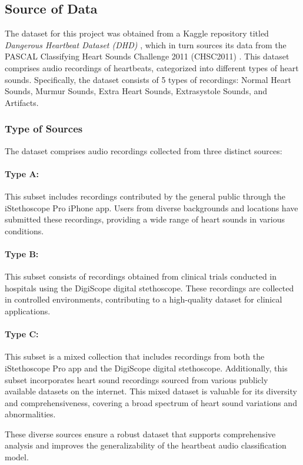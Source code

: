 \subsection{Source of Data}
The dataset for this project was obtained from a Kaggle repository titled \textit{Dangerous Heartbeat Dataset (DHD)} \cite{Dangerous-Heartbeat-Dataset-DHD},
which in turn sources its data from the PASCAL Classifying Heart Sounds Challenge 2011 (CHSC2011) \cite{pascal-chsc-2011}.
This dataset comprises audio recordings of heartbeats, categorized into different types of heart sounds.
Specifically, the dataset consists of 5 types of recordings: Normal Heart Sounds, Murmur Sounds, Extra Heart Sounds, Extrasystole Sounds, and Artifacts.
\subsubsection*{Type of Sources} %
The dataset comprises audio recordings collected from three distinct sources:
\paragraph{Type A:}
This subset includes recordings contributed by the general public through the iStethoscope Pro iPhone app.
Users from diverse backgrounds and locations have submitted these recordings, providing a wide range of heart sounds in various conditions.
\paragraph{Type B:}
This subset consists of recordings obtained from clinical trials conducted in hospitals using the DigiScope digital stethoscope.
These recordings are collected in controlled environments, contributing to a high-quality dataset for clinical applications.
\paragraph{Type C:}
This subset is a mixed collection that includes recordings from both the iStethoscope Pro app and the DigiScope digital stethoscope.
Additionally, this subset incorporates heart sound recordings sourced from various publicly available datasets on the internet.
This mixed dataset is valuable for its diversity and comprehensiveness, covering a broad spectrum of heart sound variations and abnormalities.

\noindent
These diverse sources ensure a robust dataset that supports comprehensive analysis and improves the generalizability of the heartbeat audio classification model.
